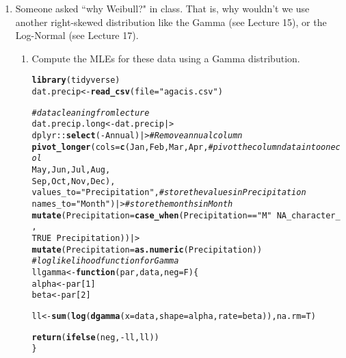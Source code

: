 \documentclass{article}\usepackage[]{graphicx}\usepackage[]{xcolor}
\makeatletter
\newcommand{\hlnum}[1]{\textcolor[rgb]{0.686,0.059,0.569}{#1}}%
\newcommand{\hlsng}[1]{\textcolor[rgb]{0.192,0.494,0.8}{#1}}%
\newcommand{\hlcom}[1]{\textcolor[rgb]{0.678,0.584,0.686}{\textit{#1}}}%
\newcommand{\hlopt}[1]{\textcolor[rgb]{0,0,0}{#1}}%
\newcommand{\hldef}[1]{\textcolor[rgb]{0.345,0.345,0.345}{#1}}%
\newcommand{\hlkwa}[1]{\textcolor[rgb]{0.161,0.373,0.58}{\textbf{#1}}}%
\newcommand{\hlkwb}[1]{\textcolor[rgb]{0.69,0.353,0.396}{#1}}%
\newcommand{\hlkwc}[1]{\textcolor[rgb]{0.333,0.667,0.333}{#1}}%
\newcommand{\hlkwd}[1]{\textcolor[rgb]{0.737,0.353,0.396}{\textbf{#1}}}%
\newenvironment{kframe}{%
 \def\at@end@of@kframe{}%
 \ifinner\ifhmode%
  \def\at@end@of@kframe{\end{minipage}}%
  \begin{minipage}{\columnwidth}%
 \fi\fi%
 \def\FrameCommand##1{\hskip\@totalleftmargin \hskip-\fboxsep
 \colorbox{shadecolor}{##1}\hskip-\fboxsep
     \hskip-\linewidth \hskip-\@totalleftmargin \hskip\columnwidth}%
 \MakeFramed {\advance\hsize-\width
   \@totalleftmargin\z@ \linewidth\hsize
   \@setminipage}}%
 {\par\unskip\endMakeFramed%
 \at@end@of@kframe}
\newenvironment{knitrout}{}{} %
\makeatother
\begin{document}
\begin{enumerate}
  \item Someone asked ``why Weibull?" in class. That is, why wouldn't we use 
  another right-skewed distribution like the Gamma (see Lecture 15), or
  the Log-Normal (see Lecture 17).
  \begin{enumerate}
    \item Compute the MLEs for these data using a Gamma distribution. 
\begin{knitrout}\scriptsize
{}\color{fgcolor}\begin{kframe}
\begin{alltt}
\hlkwd{library}\hldef{(tidyverse)}
\hldef{dat.precip} \hlkwb{<-} \hlkwd{read_csv}\hldef{(}\hlkwc{file} \hldef{=} \hlsng{"agacis.csv"}\hldef{)}

\hlcom{#data cleaning from lecture}
\hldef{dat.precip.long} \hlkwb{<-} \hldef{dat.precip |>}
  \hldef{dplyr}\hlopt{::}\hlkwd{select}\hldef{(}\hlopt{-}\hldef{Annual) |>}                   \hlcom{# Remove annual column }
  \hlkwd{pivot_longer}\hldef{(}\hlkwc{cols} \hldef{=} \hlkwd{c}\hldef{(Jan, Feb, Mar, Apr,}   \hlcom{# pivot the column data into one col}
                        \hldef{May, Jun, Jul, Aug,}
                        \hldef{Sep, Oct, Nov, Dec),}
               \hlkwc{values_to} \hldef{=} \hlsng{"Precipitation"}\hldef{,}   \hlcom{# store the values in Precipitation}
               \hlkwc{names_to} \hldef{=} \hlsng{"Month"}\hldef{) |>}         \hlcom{# store the months in Month}
  \hlkwd{mutate}\hldef{(}\hlkwc{Precipitation} \hldef{=} \hlkwd{case_when}\hldef{(Precipitation} \hlopt{==} \hlsng{"M"} \hlopt{~} \hlnum{NA_character_}\hldef{,}
                                   \hlnum{TRUE}                 \hlopt{~} \hldef{Precipitation))|>}
  \hlkwd{mutate}\hldef{(}\hlkwc{Precipitation} \hldef{=} \hlkwd{as.numeric}\hldef{(Precipitation))}
\hlcom{#log likelihood function for Gamma}
\hldef{llgamma} \hlkwb{<-} \hlkwa{function}\hldef{(}\hlkwc{par}\hldef{,} \hlkwc{data}\hldef{,} \hlkwc{neg}\hldef{=F)\{}
  \hldef{alpha} \hlkwb{<-} \hldef{par[}\hlnum{1}\hldef{]}
  \hldef{beta} \hlkwb{<-} \hldef{par[}\hlnum{2}\hldef{]}

  \hldef{ll} \hlkwb{<-} \hlkwd{sum}\hldef{(}\hlkwd{log}\hldef{(}\hlkwd{dgamma}\hldef{(}\hlkwc{x}\hldef{=data,} \hlkwc{shape}\hldef{=alpha,} \hlkwc{rate}\hldef{=beta)),} \hlkwc{na.rm}\hldef{=T)}

  \hlkwd{return}\hldef{(}\hlkwd{ifelse}\hldef{(neg,} \hlopt{-}\hldef{ll, ll))}
\hldef{\}}


\end{alltt}
\end{kframe}
\end{knitrout}
\end{enumerate}
\end{enumerate}
\end{document}

